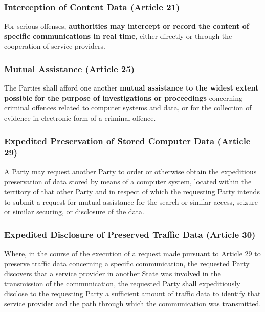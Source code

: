 \subsubsection{Interception of Content Data (Article 21)}

For serious offenses, \textbf{authorities may intercept or record the content of specific communications in real time}, either directly or through the cooperation of service providers. 

\subsubsection{Mutual Assistance (Article 25)}

The Parties shall afford one another \textbf{mutual assistance to the widest extent possible} \textbf{for the purpose of investigations or proceedings} concerning criminal offences related to computer systems and data, or for the collection of evidence in electronic form of a criminal offence.

\subsubsection{Expedited Preservation of Stored Computer Data (Article 29)}

A Party may request another Party to order or otherwise obtain the expeditious preservation of data stored by means of a computer system, located within the territory of that other Party and in respect of which the requesting Party intends to submit a request for mutual assistance for the search or similar access, seizure or similar securing, or disclosure of the data.

\subsubsection{Expedited Disclosure of Preserved Traffic Data (Article 30)}

Where, in the course of the execution of a request made pursuant to Article 29 to preserve traffic data concerning a specific communication, the requested Party discovers that a service provider in another State was involved in the transmission of the communication, the requested Party shall expeditiously disclose to the requesting Party a sufficient amount of traffic data to identify that service provider and the path through which the communication was transmitted.


